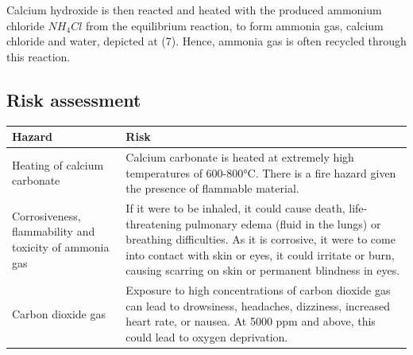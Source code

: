 \documentclass[12pt, a4paper]{article}
\begin{document}
Calcium hydroxide is then reacted and heated with the produced ammonium chloride \(NH_{4}Cl\) from the equilibrium reaction, to form ammonia gas, calcium chloride and water, depicted at (7). Hence, ammonia gas is often recycled through this reaction.



\subsection{Risk assessment}

\begin{table}[H]
	\centering
\begin{tabular}{|p{5cm}|p{12cm}|}
	\hline
\textbf{Hazard}                    & \textbf{Risk}                                                                                                                                                                                                                                                                                                                                                                                                   \\  \hline
Heating of calcium carbonate     & Calcium carbonate is heated at extremely high temperatures of 600-800°C. There is a fire hazard given the presence of flammable material.                                                                                                                                                                                                                                                                        \\  \hline
Corrosiveness, flammability and toxicity of ammonia gas                      & If it were to be inhaled, it could cause death, life-threatening pulmonary edema (fluid in the lungs) or breathing difficulties. As it is corrosive, it were to come into contact with skin or eyes, it could irritate or burn, causing scarring on skin or permanent blindness in eyes.                                                                        \\  \hline
Carbon dioxide gas               & Exposure to high concentrations of carbon dioxide gas can lead to drowsiness, headaches, dizziness, increased heart rate, or nausea. At 5000 ppm and above, this could lead to oxygen deprivation.                                                                                                                                                                                                                \\  \hline

\end{tabular}
\end{table}
\end{document}
